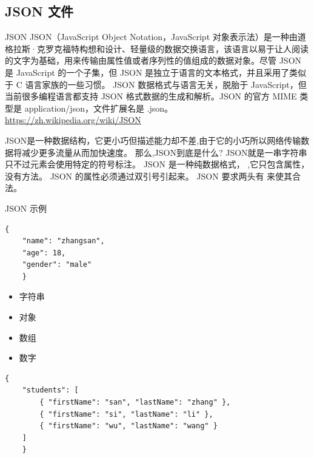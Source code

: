 \documentclass{beamer}
\begin{document}
\subsection{JSON 文件}

\begin{frame}{JSON}
    JSON（JavaScript Object Notation，JavaScript 对象表示法）是一种由道格拉斯·克罗克福特构想和设计、轻量级的数据交换语言，该语言以易于让人阅读的文字为基础，用来传输由属性值或者序列性的值组成的数据对象。尽管 JSON 是 JavaScript 的一个子集，但 JSON 是独立于语言的文本格式，并且采用了类似于 C 语言家族的一些习惯。
    JSON 数据格式与语言无关，脱胎于 JavaScript，但当前很多编程语言都支持 JSON 格式数据的生成和解析。JSON 的官方 MIME 类型是 application/json，文件扩展名是 .json。 \url{https://zh.wikipedia.org/wiki/JSON}
    \begin{note}
        {JSON是一种数据结构，它更小巧但描述能力却不差,由于它的小巧所以网络传输数据将减少更多流量从而加快速度。
        那么,JSON到底是什么?
        JSON就是一串字符串 只不过元素会使用特定的符号标注。
        JSON 是一种纯数据格式，
        ,它只包含属性，没有方法。
        JSON 的属性必须通过双引号引起来。
        JSON 要求两头有 {} 来使其合法。}
    \end{note}
\end{frame}

\begin{frame}[fragile]{JSON 示例}
    \begin{minipage}{0.6\linewidth}
        \begin{lstlisting}[language=Tex]
{
    "name": "zhangsan",
    "age": 18,
    "gender": "male"
    }
\end{lstlisting}
    \end{minipage}\hspace{1cm}
    \begin{minipage}{0.2\linewidth}
        \begin{itemize}
            \item 字符串
            \item 对象
            \item 数组
            \item 数字
        \end{itemize}
    \end{minipage}
    \medskip
    \begin{minipage}{\linewidth}
        \begin{lstlisting}[language=Tex]
{
    "students": [
        { "firstName": "san", "lastName": "zhang" },
        { "firstName": "si", "lastName": "li" },
        { "firstName": "wu", "lastName": "wang" }
    ]
    }
\end{lstlisting}
    \end{minipage}\hspace{1cm}
\end{frame}
\end{document}
